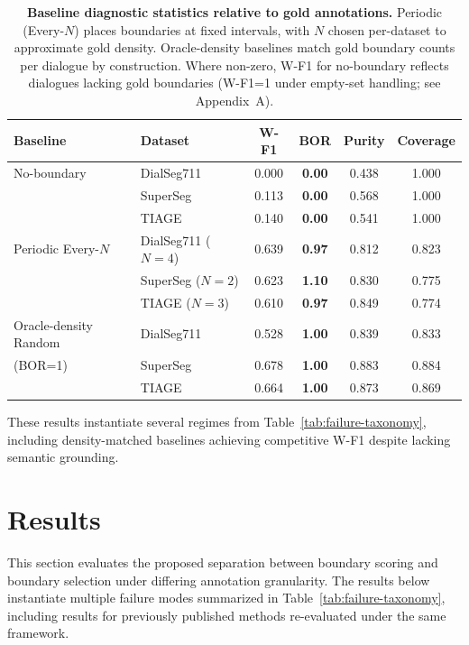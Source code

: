 \documentclass{article}
\begin{document}
\begin{table}[t]
  \centering
  \begin{tabular}{l l c c c c}
    \toprule
    Baseline & Dataset & W-F1 & \textbf{BOR} & Purity & Coverage \\
    \midrule 
    No-boundary & DialSeg711 & 0.000 & \textbf{0.00} & 0.438 & 1.000 \\
    & SuperSeg & 0.113 & \textbf{0.00} & 0.568 & 1.000 \\ 
    & TIAGE & 0.140 & \textbf{0.00} & 0.541 & 1.000 \\ 
    \midrule 
    Periodic Every-$N$ & DialSeg711 ($N=4$) & 0.639 & \textbf{0.97} & 0.812 & 0.823 \\
    & SuperSeg ($N=2$) & 0.623 & \textbf{1.10} & 0.830 & 0.775 \\
    & TIAGE ($N=3$) & 0.610 & \textbf{0.97} & 0.849 & 0.774 \\ 
    \midrule 
    Oracle-density Random & DialSeg711 & 0.528 & \textbf{1.00} & 0.839 & 0.833 \\
    (BOR=1) & SuperSeg & 0.678 & \textbf{1.00} & 0.883 & 0.884 \\ 
    & TIAGE & 0.664 & \textbf{1.00} & 0.873 & 0.869 \\ 
    \bottomrule
  \end{tabular}
  \caption{\textbf{Baseline diagnostic statistics relative to gold annotations.}
    Periodic (Every-$N$) places boundaries at fixed intervals, with $N$ chosen 
    per-dataset to approximate gold density. Oracle-density baselines match gold 
    boundary counts per dialogue by construction. Where non-zero, W-F1 for no-boundary
    reflects dialogues lacking gold boundaries (W-F1=1 under empty-set handling;
    see Appendix~A).}
  \label{tab:baselines}
\end{table}

These results instantiate several regimes from
Table~\ref{tab:failure-taxonomy}, including density-matched baselines
achieving competitive W-F1 despite lacking semantic grounding.

\section{Results}
\label{sec:results}
This section evaluates the proposed separation between boundary
scoring and boundary selection under differing annotation
granularity. The results below instantiate multiple failure modes
summarized in Table~\ref{tab:failure-taxonomy}, including results for
previously published methods re-evaluated under the same framework.
\end{document}
